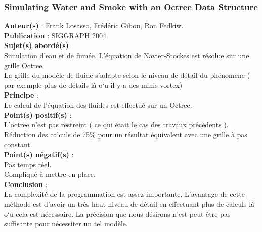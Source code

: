 \documentclass[a4paper,10pt]{article}
\begin{document}
\subsubsection{Simulating Water and Smoke with an Octree Data Structure}
\textbf{Auteur(s)} : Frank Losasso, Frédéric Gibou, Ron Fedkiw.\\
\textbf{Publication} : SIGGRAPH 2004\\
\textbf{Sujet(s) abordé(s)} : \\
	Simulation d'eau et de fumée. L'équation de Navier-Stockes est résolue sur une grille Octree.\\
	La grille du modèle de fluide s'adapte selon le niveau de détail du phénomène ( par exemple plus de détails là o`u il y a des minis vortex)\\
\textbf{Principe} :\\	
	Le calcul de l'équation des fluides est effectué sur un Octree.\\
\textbf{Point(s) positif(s)} :\\
	L'octree n'est pas restreint ( ce qui était le cas des travaux précédents ).\\
	Réduction des calculs de 75\% pour un résultat équivalent avec une grille à pas constant.\\
\textbf{Point(s) négatif(s)} :\\
	Pas temps réel.\\
	Compliqué à mettre en place.\\
\textbf{Conclusion} :\\
	La complexité de la programmation est assez importante. L'avantage de cette méthode est d'avoir un très haut niveau de détail en effectuant plus de calculs là o`u cela est nécessaire. La précision que nous désirons n'est peut être pas suffisante pour nécessiter un tel modèle.
\end{document}
